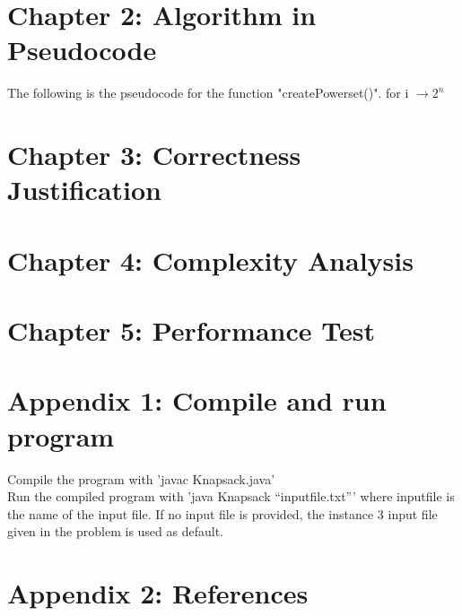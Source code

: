 \documentclass{article}
\begin{document}
\section*{Chapter 2: Algorithm in Pseudocode}

\noindent The following is the pseudocode for the function "createPowerset()". \newline
for i $\rightarrow 2^n$




\section*{Chapter 3: Correctness Justification}

\section*{Chapter 4: Complexity Analysis}

\section*{Chapter 5: Performance Test}

\section*{Appendix 1: Compile and run program}
\noindent Compile the program with 'javac Knapsack.java'\\ 
\noindent Run the compiled program with 'java Knapsack ``inputfile.txt''' where inputfile is the name of the input file. If no input file is provided, the instance 3 input file given in the problem is used as default. 

\section*{Appendix 2: References}

\end{document}
